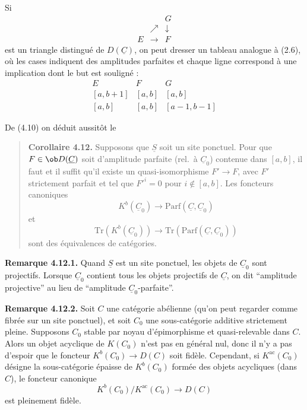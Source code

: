 Si
\[
\begin{array}{ccc}
& & G \\
& \nearrow & \downarrow \\
E & \longrightarrow & F
\end{array}
\]
est un triangle distingué de $D(\underline{C})$, on peut dresser un tableau analogue à (2.6), où les cases indiquent des amplitudes parfaites et chaque ligne correspond à une implication dont le but est souligné :
\[
\begin{array}{ccc}
E & F & G \\
{}[a, b+1] & [a, b] & [a, b] \\
{}[a, b] & [a, b] & [a-1, b-1]
\end{array}
\]

De (4.10) on déduit aussitôt le

\begin{quote}
\textbf{Corollaire 4.12.} Supposons que $\underline{S}$ soit un site ponctuel. Pour que $F \in \ob D(\underline{C})$ soit d'amplitude parfaite (rel.\ à $\underline{C}_0$) contenue dans $[a, b]$, il faut et il suffit qu'il existe un quasi-isomorphisme $F' \to F$, avec $F'$ strictement parfait et tel que $F'^i = 0$ pour $i \notin [a, b]$. Les foncteurs canoniques
\[
K^b(\underline{C}_0) \longrightarrow \mathrm{Parf}(\underline{C}, \underline{C}_0)
\]
et
\[
\mathrm{Tr}(K^b(\underline{C}_0)) \longrightarrow \mathrm{Tr}(\mathrm{Parf}(\underline{C}, \underline{C}_0))
\]
sont des équivalences de catégories.
\end{quote}

\textbf{Remarque 4.12.1.} Quand $\underline{S}$ est un site ponctuel, les objets de $\underline{C}_0$ sont projectifs. Lorsque $\underline{C}_0$ contient tous les objets projectifs de $\underline{C}$, on dit ``amplitude projective'' au lieu de ``amplitude $\underline{C}_0$-parfaite''.

\textbf{Remarque 4.12.2.} Soit $C$ une catégorie abélienne (qu'on peut regarder comme fibrée sur un site ponctuel), et soit $C_0$ une sous-catégorie additive strictement pleine. Supposons $C_0$ stable par noyau d'épimorphisme et quasi-relevable dans $C$. Alors un objet acyclique de $K(C_0)$ n'est pas en général nul, donc il n'y a pas d'espoir que le foncteur $K^b(C_0) \to D(C)$ soit fidèle. Cependant, si $K^{\mathrm{ac}}(C_0)$ désigne la sous-catégorie épaisse de $K^b(C_0)$ formée des objets acycliques (dans $C$), le foncteur canonique
\[
K^b(C_0)/K^{\mathrm{ac}}(C_0) \longrightarrow D(C)
\]
est pleinement fidèle.

